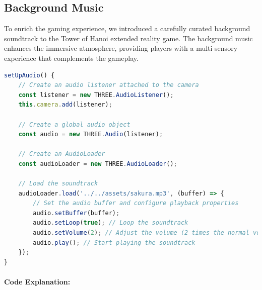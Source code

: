 \documentclass{article}
\begin{document}
\subsection{Background Music}

To enrich the gaming experience, we introduced a carefully curated background soundtrack to the Tower of Hanoi extended reality game. The background music enhances the immersive atmosphere, providing players with a multi-sensory experience that complements the gameplay.

\begin{lstlisting}[language=JavaScript, caption={JS code for adding Audio}]
setUpAudio() {
    // Create an audio listener attached to the camera
    const listener = new THREE.AudioListener();
    this.camera.add(listener);

    // Create a global audio object
    const audio = new THREE.Audio(listener);

    // Create an AudioLoader
    const audioLoader = new THREE.AudioLoader();

    // Load the soundtrack
    audioLoader.load('../../assets/sakura.mp3', (buffer) => {
        // Set the audio buffer and configure playback properties
        audio.setBuffer(buffer);
        audio.setLoop(true); // Loop the soundtrack
        audio.setVolume(2); // Adjust the volume (2 times the normal volume)
        audio.play(); // Start playing the soundtrack
    });
}
\end{lstlisting}

\paragraph{Code Explanation:}
\end{document}
